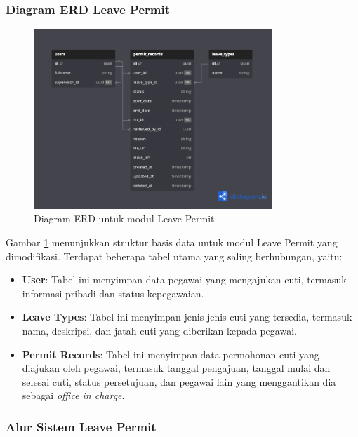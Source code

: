 \subsubsection{Diagram ERD Leave Permit}
\begin{figure}[H]
    \centering
    \includegraphics[width=0.8\textwidth]{assets/pics/fig_erd_leave_permit.png}
    \caption{Diagram ERD untuk modul Leave Permit}
    \label{fig:erd_leave_permit}
\end{figure}

Gambar \ref{fig:erd_leave_permit} menunjukkan struktur basis data untuk modul Leave Permit yang dimodifikasi. Terdapat beberapa tabel utama yang saling berhubungan, yaitu:
\begin{itemize}
    \item \textbf{User}: Tabel ini menyimpan data pegawai yang mengajukan cuti, termasuk informasi pribadi dan status kepegawaian.
    \item \textbf{Leave Types}: Tabel ini menyimpan jenis-jenis cuti yang tersedia, termasuk nama, deskripsi, dan jatah cuti yang diberikan kepada pegawai.
    \item \textbf{Permit Records}: Tabel ini menyimpan data permohonan cuti yang diajukan oleh pegawai, termasuk tanggal pengajuan, tanggal mulai dan selesai cuti, status persetujuan, dan pegawai lain yang menggantikan dia sebagai \textit{office in charge}.
\end{itemize}


\subsubsection{Alur Sistem Leave Permit}

